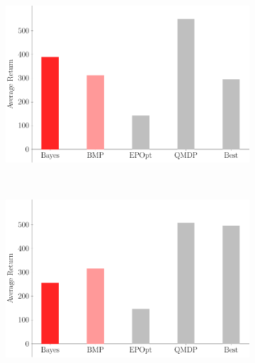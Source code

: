 \documentclass{article}
\begin{document}
\newpage
\begin{figure}[t!]
\begin{centering}
\begin{subfigure}[b]{0.38\columnwidth}
\includegraphics[width=\linewidth]{figs/cheetah_nominal_comparison.pdf}
\end{subfigure}
~
\begin{subfigure}[b]{0.38\columnwidth}
\includegraphics[width=\linewidth]{figs/cheetah_env_comparison.pdf}
\end{subfigure}
~
\begin{subfigure}[b]{0.20\columnwidth}

\end{subfigure}
\end{centering}
\end{figure}
\end{document}

